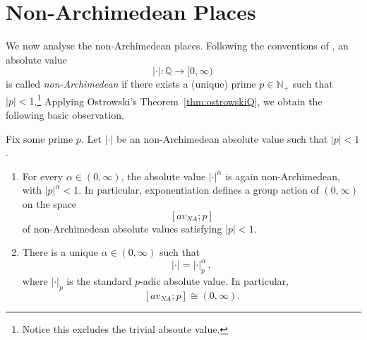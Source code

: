 \documentclass[a4paper, 11pt,reqno]{amsart}
\newcommand{\N}{\mathbb{N}}
\newcommand{\Q}{\mathbb{Q}}
\begin{document}
\section{Non-Archimedean Places}\label{sec:NonArch}

We now analyse the non-Archimedean places. Following the conventions of \cite{NVOstrowski}, an absolute value 
$$|\cdot|\colon\Q\to [0,\infty)\,$$
is called {\em non-Archimedean} if there exists a (unique) prime $p\in\N_+$ such that $|p|<1$.\footnote{Notice this excludes the trivial absoute value.} Applying Ostrowski's Theorem~\ref{thm:ostrowskiQ}, we obtain the following basic observation.

\begin{observation}\label{obs:stillnonARCH} Fix some prime $p$. Let $|\cdot|$ be an non-Archimedean absolute value such that $|p|<1$.
	\begin{enumerate}[label=(\roman*)]
		\item For every $\alpha\in(0,\infty)$, the absolute value $|\cdot|^\alpha$ is again non-Archimedean, with $|p|^\alpha<1$. In particular, exponentiation defines a group action of $(0,\infty)$ on the space %
	$$	[av_{NA};p]$$
		of non-Archimedean absolute values satisfying $|p|<1$.
		\item There is a unique $\alpha\in(0,\infty)$ such that $$|\cdot|=|\cdot|_p^\alpha\,,$$ where $|\cdot|_p$ is the standard $p$-adic absolute value. In particular, \[ [av_{NA};p]\cong(0,\infty). \]
		
	\end{enumerate}
\end{observation}

\end{document}
